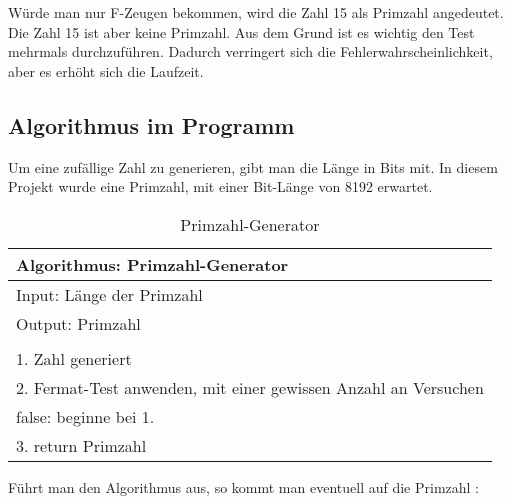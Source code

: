 Würde man nur F-Zeugen bekommen, wird die Zahl 15 als Primzahl angedeutet. Die Zahl 15 ist aber keine Primzahl.
Aus dem Grund ist es wichtig den Test mehrmals durchzuführen. Dadurch verringert sich die Fehlerwahrscheinlichkeit, aber es erhöht sich die Laufzeit.\\

\subsection*{Algorithmus im Programm}

Um eine zufällige Zahl zu generieren, gibt man die Länge in Bits mit. In diesem Projekt wurde eine Primzahl, mit einer Bit-Länge von 8192 erwartet.

\begin{table}[!ht]
    \centering
        \begin{tabular}{l}
            \toprule
            \textbf{Algorithmus: Primzahl-Generator}\\
            \midrule
            Input: Länge der Primzahl\\
            Output: Primzahl  \\
            \\
            1. Zahl generiert\\
            2. Fermat-Test anwenden, mit einer gewissen Anzahl an Versuchen\\
                false: beginne bei 1. \\
            3. return Primzahl\\
           \bottomrule
        \end{tabular}
        \caption{Primzahl-Generator}
        \label{tab3}
    \end{table}

\newpage
Führt man den Algorithmus aus, so kommt man eventuell auf die Primzahl :

